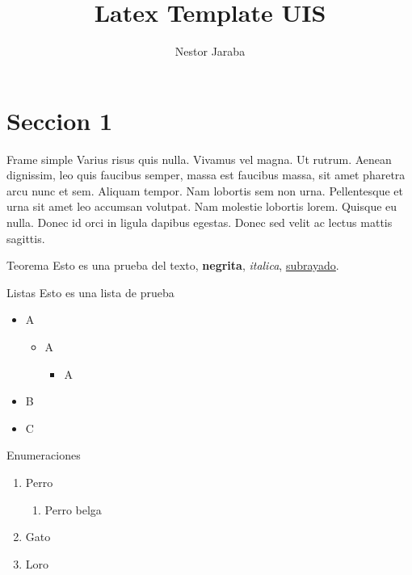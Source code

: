 \documentclass{beamer}
\title[Diapositivas en Beamer]{Latex Template UIS}
\author{Nestor Jaraba}
\institute[UIS]{Universidad Industrial de Santander}
\begin{document}
\maketitle

\section{Seccion 1}
\begin{uis-frame}{Frame simple}
	Varius risus quis nulla. Vivamus vel magna. Ut rutrum. Aenean dignissim, leo
	quis faucibus semper, massa est faucibus massa, sit amet pharetra arcu nunc et
	sem. Aliquam tempor. Nam lobortis sem non urna. Pellentesque et urna sit amet
	leo accumsan volutpat. Nam molestie lobortis lorem. Quisque eu nulla. Donec id
	orci in ligula dapibus egestas. Donec sed velit ac lectus mattis sagittis.

	

	\begin{block}{Teorema}
		Esto es una prueba del texto, \textbf{negrita}, \textit{italica}, \underline{subrayado}.
	\end{block}
\end{uis-frame}

\begin{uis-frame}{Listas}
	Esto es una lista de prueba
	\begin{itemize}
		\item A
		\begin{itemize}
		  \item A
		    \begin{itemize}
		      \item A
		    \end{itemize}
		\end{itemize}
		\item B
		\item C
	\end{itemize}
\end{uis-frame}

\begin{uis-frame}{Enumeraciones}
	\begin{enumerate}
		\item Perro
		\begin{enumerate}
		  \item Perro belga
		\end{enumerate}
		\item Gato
		\item Loro
	\end{enumerate}
\end{uis-frame}
\end{document}

